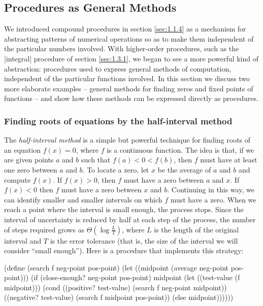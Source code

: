 \subsection{Procedures as General Methods}
\label{sec:1.3.3}


We introduced compound procedures in section \ref{sec:1.1.4} as a
mechanism for abstracting patterns of numerical operations so as to
make them independent of the particular numbers involved.  With
higher-order procedures, such as the \scheme|integral| procedure of
section \ref{sec:1.3.1}, we began to see a more powerful kind of
abstraction: procedures used to express general methods of
computation, independent of the particular functions involved.  In
this section we discuss two more elaborate examples -- general methods
for finding zeros and fixed points of functions -- and show how these
methods can be expressed directly as procedures.


\subsubsection*{Finding roots of equations by the half-interval method}


The \textit{half-interval method} is a simple but powerful technique
for finding roots of an equation $f(x) = 0$, where $f$ is a continuous
function.  The idea is that, if we are given points $a$ and $b$ such
that $f(a) < 0 < f(b)$, then $f$ must have at least one zero between
$a$ and $b$.  To locate a zero, let $x$ be the average of $a$ and $b$
and compute $f(x)$.  If $f(x) > 0$, then $f$ must have a zero between
$a$ and $x$.  If $f(x) < 0$ then $f$ must have a zero between $x$ and
$b$.  Continuing in this way, we can identify smaller and smaller
intervals on which $f$ must have a zero.  When we reach a point where
the interval is small enough, the process stops.  Since the interval
of uncertainty is reduced by half at each step of the process, the
number of steps required grows as $\Theta(\log
\frac{L}{T})$, where $L$ is the length of the
original interval and $T$ is the error tolerance (that is, the
size of the interval we will consider ``small enough'').  Here is a
procedure that implements this strategy:


\begin{schemedisplay}
(define (search f neg-point pos-point)
  (let ((midpoint (average neg-point pos-point)))
    (if (close-enough? neg-point pos-point)
        midpoint
        (let ((test-value (f midpoint)))
          (cond ((positive? test-value)
                 (search f neg-point midpoint))
                ((negative? test-value)
                 (search f midpoint pos-point))
                (else midpoint))))))
\end{schemedisplay}

